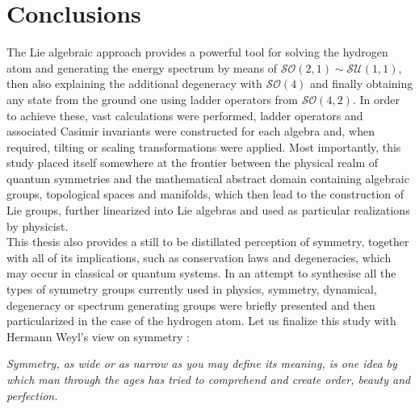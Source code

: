 \documentclass[12pt,a4paper]{report}
\theoremstyle{definition}
\theoremstyle{remark}
\theoremstyle{remark}
\begin{document}
\chapter*{Conclusions}
The Lie algebraic approach provides a powerful tool for solving the hydrogen atom and generating the energy spectrum by means of $\mathcal{SO}(2,1)\sim\mathcal{SU}(1,1)$, then also explaining the additional degeneracy with $\mathcal{SO}(4)$ and finally obtaining any state from the ground one using ladder operators from $\mathcal{SO}(4,2)$. In order to achieve these, vast calculations were performed, ladder operators and associated Casimir invariants were constructed for each algebra and, when required, tilting or scaling transformations were applied. Most importantly, this study placed itself somewhere at the frontier between the physical realm of quantum symmetries and the mathematical abstract domain containing algebraic groups, topological spaces and manifolds, which then lead to the construction of Lie groups, further linearized into Lie algebras and used as particular realizations by physicist. \\ \indent
This thesis also provides a still to be distillated perception of symmetry, together with all of its implications, such as conservation laws and degeneracies, which may occur in classical or quantum systems. In an attempt to synthesise all the types of symmetry groups currently used in physics, symmetry, dynamical, degeneracy or spectrum generating groups were briefly presented and then particularized in the case of the hydrogen atom. Let us finalize this study with Hermann Weyl's view on symmetry \cite{weyl}:
\begin{displayquote}
\textit{Symmetry, as wide or as narrow as you may define its meaning, is one idea by which man through the ages has tried to comprehend and create order, beauty and perfection.}
\end{displayquote}
\end{document}
